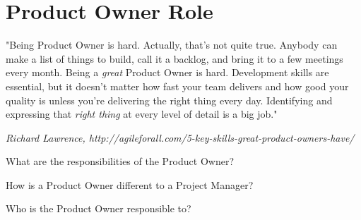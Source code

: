 \chapter*{Product Owner Role}

\begin{framed}
   "Being Product Owner is hard. Actually, that's not quite true. Anybody can make a list of things to build, call it a backlog, and bring it to a few meetings every month. Being a \emph{great} Product Owner is hard. Development skills are essential, but it doesn't matter how fast your team delivers and how good your quality is unless you're delivering the right thing every day. Identifying and expressing that \emph{right thing} at every level of detail is a big job." 
   
   \begin{flushright}
        \textit{Richard Lawrence, http://agileforall.com/5-key-skills-great-product-owners-have/}
    \end{flushright}
\end{framed}    

\vspace{0.5cm}
What are the responsibilities of the Product Owner?


How is a Product Owner different to a Project Manager?


Who is the Product Owner responsible to?

